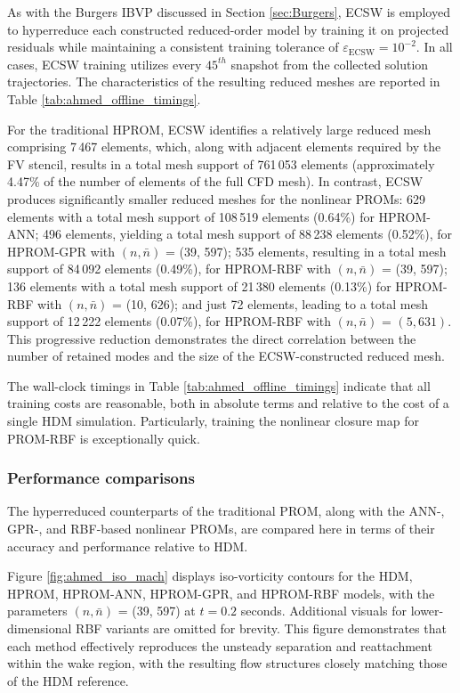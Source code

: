 \documentclass[preprint,10pt]{elsarticle}
\begin{document}
As with the Burgers IBVP discussed in Section \ref{sec:Burgers}, ECSW is employed to hyperreduce each constructed reduced-order model by training it on projected residuals while maintaining a consistent training tolerance of $\varepsilon_{\text{ECSW}} = 10^{-2}$. In all cases, ECSW training utilizes every $45^{th}$ snapshot from the collected solution trajectories. The characteristics of the resulting reduced meshes are reported in Table \ref{tab:ahmed_offline_timings}.

For the traditional HPROM, ECSW identifies a relatively large reduced mesh comprising 7\,467 elements, which, along with adjacent 
elements required by the FV stencil, results in a total mesh support of 761\,053 elements (approximately 4.47\% of the number of 
elements of the full CFD mesh). In contrast, ECSW produces significantly smaller reduced meshes for the nonlinear PROMs: 629 elements 
with a total mesh support of 108\,519 elements (0.64\%) for HPROM-ANN; 496 elements, yielding a total mesh support of 88\,238 elements
(0.52\%), for HPROM-GPR with $(n, \bar{n})$ = (39, 597); 535 elements, resulting in a total mesh support of 84\,092 elements (0.49\%), 
for HPROM-RBF with $(n, \bar{n})$ = (39, 597); 136 elements with a total mesh support of 21\,380 elements (0.13\%) for HPROM-RBF with 
$(n, \bar{n})$ = (10, 626); and just 72 elements, leading to a total mesh support of 12\,222 elements (0.07\%), for HPROM-RBF with 
$(n, \bar{n})$ = $(5, 631)$. This progressive reduction demonstrates the direct correlation between the number of retained modes and the size of the ECSW-constructed reduced mesh.

The wall-clock timings in Table \ref{tab:ahmed_offline_timings} indicate that all training costs are reasonable, both in absolute 
terms and relative to the cost of a single HDM simulation. Particularly, training the nonlinear closure map for PROM-RBF is 
exceptionally quick.

\subsubsection{Performance comparisons}

The hyperreduced counterparts of the traditional PROM, along with the ANN-, GPR-, and RBF-based nonlinear PROMs, are compared here in terms of their accuracy and performance relative to HDM.

Figure \ref{fig:ahmed_iso_mach} displays iso-vorticity contours for the HDM, HPROM, HPROM-ANN, HPROM-GPR, and HPROM-RBF models, with the parameters $(n, \bar{n})$ = (39, 597) at $t = 0.2$ seconds. Additional visuals for lower-dimensional RBF variants are omitted for brevity. This figure demonstrates that each method effectively reproduces the unsteady separation and reattachment within the wake region, with the resulting flow structures closely matching those of the HDM reference.
\end{document}
